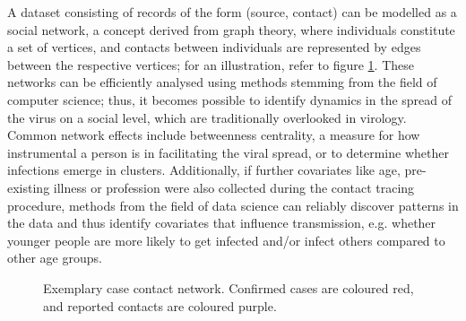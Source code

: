 A dataset consisting of records of the form (source, contact) can be modelled as a social network, a concept derived from graph theory, where individuals constitute a set of vertices, and contacts between individuals are represented by edges between the respective vertices; for an illustration, refer to figure \ref{fig:example_case_network}. These networks can be efficiently analysed using methods stemming from the field of computer science; thus, it becomes possible to identify dynamics in the spread of the virus on a social level, which are traditionally overlooked in virology. Common network effects include betweenness centrality, a measure for how instrumental a person is in facilitating the viral spread, or  to determine whether infections emerge in clusters. Additionally, if further covariates like age, pre-existing illness or profession were also collected during the contact tracing procedure, methods from the field of data science can reliably discover patterns in the data and thus identify covariates that influence transmission, e.g. whether younger people are more likely to get infected and/or infect others compared to other age groups.

\begin{figure}
	\centering
	\caption{Exemplary case contact network. Confirmed cases are coloured red, and reported contacts are coloured purple.}
	\label{fig:example_case_network}
\end{figure}

